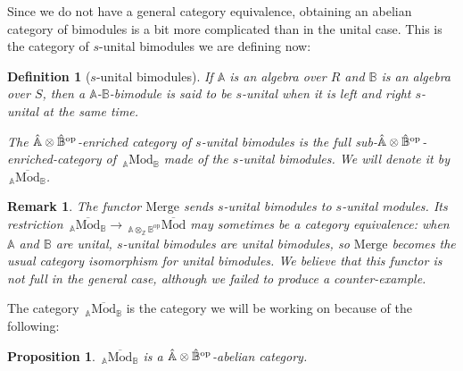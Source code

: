 \documentclass[a4paper,fleqn]{cas-sc}
\newtheorem{prop}[thm]{Proposition}%
\newtheorem{rem}{Remark}%
\newtheorem{dfnt}{Definition}%
\newcommand{\bA}{\mathbb{A}}
\newcommand{\bB}{\mathbb{B}}
\newcommand{\smod}{\overline{\mathrm{Mod}}}
\newcommand{\merg}{\mathrm{Merge}}
\begin{document}
Since we do not have a general category equivalence, obtaining an abelian category of bimodules is a bit more complicated than in the unital case. This is the category of $s$-unital bimodules we are defining now: 


\begin{dfnt}[$s$-unital bimodules]
If $\bA$ is an algebra over $R$ and $\bB$ is an algebra over $S$, then a $\bA$-$\bB$-bimodule is said to be $s$-unital when it is left and right $s$-unital at the same time.

The $\Hat{\bA} \otimes \Hat{\bB}^{\text{op}} $-enriched category of $s$-unital bimodules is the full sub-$\Hat{\bA} \otimes \Hat{\bB}^{\text{op}} $-enriched-category of $\,_\bA \mathrm{Mod}_\bB$ made of the $s$-unital bimodules. We will denote it by $\,_\bA\smod_\bB$.
\end{dfnt}

\begin{rem}
The functor $\merg$ sends $s$-unital bimodules to $s$-unital modules. Its restriction
$\,_\bA \smod _\bB \to \,_{\bA \otimes_{\mathbb{Z}} \bB^{\text{op}}}{\smod}$ may %
sometimes be a category equivalence: when $\bA$ and $\bB$ are unital, $s$-unital bimodules are unital bimodules, so $\merg$ becomes the usual category isomorphism for unital bimodules. We believe that this functor is not full in the general case, although we failed to produce a counter-example.
\end{rem}

The category $\,_\bA\smod_\bB$ is the category we will be working on because of the following:

\begin{prop}
\label{prop:11}
$\,_\bA\smod_\bB$ is a $\Hat{\bA} \otimes \Hat{\bB}^{\text{op}} $-abelian category.
\end{prop}
\end{document}
